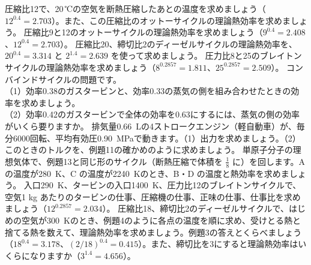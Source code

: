 \bkendproblems
{}
\bkproblem 圧縮比12で、20\,℃の空気を断熱圧縮したあとの温度を求めましょう（$12^{0.4}=2.703$）。また、この圧縮比のオットーサイクルの理論熱効率を求めましょう。
\bkproblem 圧縮比9と12のオットーサイクルの理論熱効率を求めましょう（$9^{0.4}=2.408$、$12^{0.4}=2.703$）。
\bkproblem 圧縮比20、締切比2のディーゼルサイクルの理論熱効率を、$20^{0.4}=3.314$ と $2^{1.4}=2.639$ を使って求めましょう。
\bkproblem 圧力比8と25のブレイトンサイクルの理論熱効率を求めましょう（$8^{0.2857}=1.811$、$25^{0.2857}=2.509$）。
\bkproblem コンバインドサイクルの問題です。\\
（1）効率0.38のガスタービンと、効率0.33の蒸気の側を組み合わせたときの効率を求めましょう。\\
（2）効率0.42のガスタービンで全体の効率を0.63にするには、蒸気の側の効率がいくら要りますか。
\bkproblem 排気量\qty{0.66}{L}の4ストロークエンジン（軽自動車）が、毎分6000回転、平均有効圧\qty{0.90}{MPa}で動きます。（1）出力を求めましょう。（2）このときのトルクを、例題11の確かめのように求めましょう。
\bkproblem 単原子分子の理想気体で、例題13と同じ形のサイクル（断熱圧縮で体積を $\tfrac{1}{8}$ に）を回します。A の温度が\qty{280}{K}、C の温度が\qty{2240}{K}のとき、B・D の温度と熱効率を求めましょう。
\bkproblem 入口\qty{290}{K}、タービンの入口\qty{1400}{K}、圧力比12のブレイトンサイクルで、空気1 kg あたりのタービンの仕事、圧縮機の仕事、正味の仕事、仕事比を求めましょう（$12^{0.2857}=2.034$）。
\bkproblem 圧縮比18、締切比2のディーゼルサイクルで、はじめの空気が\qty{300}{K}のとき、例題4のように各点の温度を順に求め、受けとる熱と捨てる熱を数えて、理論熱効率を求めましょう。例題3の答えとくらべましょう（$18^{0.4}=3.178$、$(2/18)^{0.4}=0.415$）。また、締切比を3にすると理論熱効率はいくらになりますか（$3^{1.4}=4.656$）。
